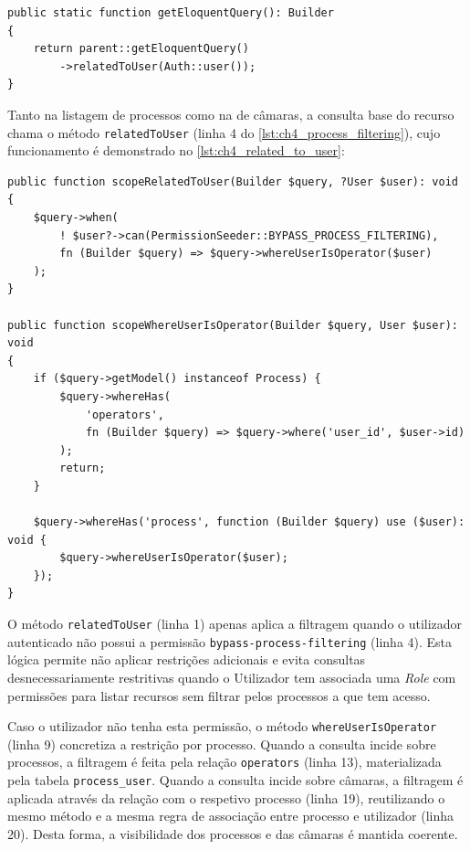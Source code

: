\par\noindent\begin{minipage}{\linewidth}
\begin{lstlisting}[caption={Excerto demonstrativo da filtragem por processo e câmara (php)},label={lst:ch4_process_filtering}]
public static function getEloquentQuery(): Builder
{
    return parent::getEloquentQuery()
        ->relatedToUser(Auth::user());
}
\end{lstlisting}
\end{minipage}

Tanto na listagem de processos como na de câmaras, a consulta base do recurso chama o método \texttt{relatedToUser} (linha 4 do \autoref{lst:ch4_process_filtering}), cujo funcionamento é demonstrado no \autoref{lst:ch4_related_to_user}:
\par\noindent\begin{minipage}{\linewidth}
\begin{lstlisting}[caption={Excerto do funcionamento do filtro \textit{relatedToUser} (php)},label={lst:ch4_related_to_user}]
public function scopeRelatedToUser(Builder $query, ?User $user): void
{
    $query->when(
        ! $user?->can(PermissionSeeder::BYPASS_PROCESS_FILTERING),
        fn (Builder $query) => $query->whereUserIsOperator($user)
    );
}

public function scopeWhereUserIsOperator(Builder $query, User $user): void
{
    if ($query->getModel() instanceof Process) {
        $query->whereHas(
            'operators',
            fn (Builder $query) => $query->where('user_id', $user->id)
        );
        return;
    }

    $query->whereHas('process', function (Builder $query) use ($user): void {
        $query->whereUserIsOperator($user);
    });
}
\end{lstlisting}
\end{minipage}


O método \texttt{relatedToUser} (linha 1) apenas aplica a filtragem quando o utilizador autenticado não possui a permissão \texttt{bypass-process-filtering} (linha 4). Esta lógica permite não aplicar restrições adicionais e evita consultas desnecessariamente restritivas quando o Utilizador tem associada uma \textit{Role} com permissões para listar recursos sem filtrar pelos processos a que tem acesso.

Caso o utilizador não tenha esta permissão, o método \texttt{whereUserIsOperator} (linha 9) concretiza a restrição por processo. Quando a consulta incide sobre processos, a filtragem é feita pela relação \texttt{operators} (linha 13), materializada pela tabela \texttt{process\_user}. Quando a consulta incide sobre câmaras, a filtragem é aplicada através da relação com o respetivo processo (linha 19), reutilizando o mesmo método e a mesma regra de associação entre processo e utilizador (linha 20). Desta forma, a visibilidade dos processos e das câmaras é mantida coerente.

